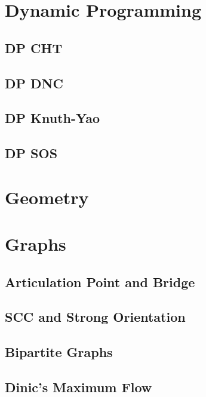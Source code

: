\section{Dynamic Programming}
\subsection{DP CHT}

\subsection{DP DNC}

\subsection{DP Knuth-Yao}

\subsection{DP SOS}

\section{Geometry}
\section{Graphs}
\subsection{Articulation Point and Bridge}

\subsection{SCC and Strong Orientation}

\subsection{Bipartite Graphs}

\subsection{Dinic's Maximum Flow}


